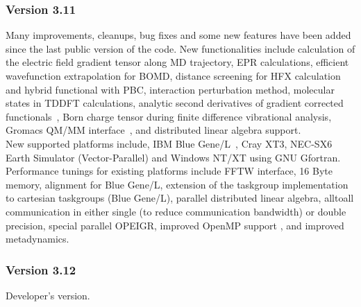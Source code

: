 \documentclass[twoside,10pt,titlepage,a4paper]{article}
\begin{document}
\subsubsection{Version 3.11}
  Many improvements, cleanups, bug fixes and some new features
  have been added since the last public version of the code.
  New functionalities include calculation of the electric field 
  gradient tensor along MD trajectory, EPR calculations, efficient 
  wavefunction extrapolation for BOMD, distance screening for HFX 
  calculation and hybrid functional with PBC, interaction perturbation method,
  molecular states in TDDFT calculations, analytic second derivatives of 
  gradient corrected functionals~\cite{xcder}, Born charge tensor during 
  finite difference vibrational analysis, Gromacs  QM/MM 
  interface~\cite{gmxqmmm}, and distributed linear algebra support. \\
  New supported platforms include, IBM Blue Gene/L~\cite{bgl}, Cray XT3,
  NEC-SX6 Earth Simulator (Vector-Parallel) and Windows NT/XT using GNU Gfortran.
  Performance tunings for existing platforms include FFTW interface,
  16 Byte memory, alignment for Blue Gene/L, extension of the taskgroup 
  implementation to cartesian taskgroups (Blue Gene/L),
  parallel distributed linear algebra, 
  alltoall communication in either single (to reduce
  communication bandwidth) or double precision, special parallel OPEIGR,
  improved OpenMP support \cite{mixed}, and improved metadynamics.


\subsubsection{Version 3.12}

  Developer's version.
\end{document}

